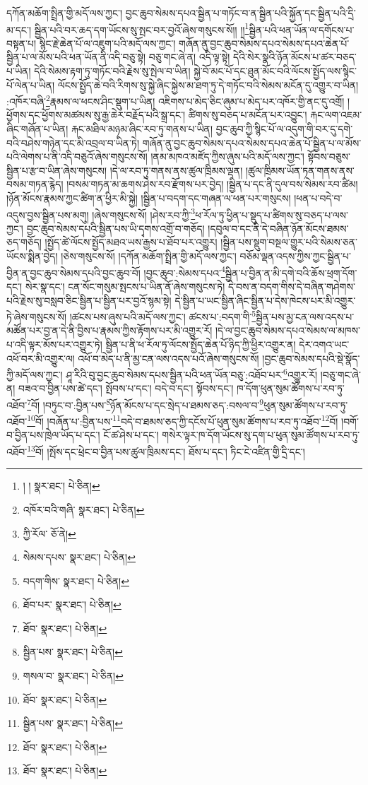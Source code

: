 དཀོན་མཆོག་སྤྲིན་གྱི་མདོ་ལས་ཀྱང་། བྱང་ཆུབ་སེམས་དཔའ་སྦྱིན་པ་གཏོང་བ་ན་སྦྱིན་པའི་སྐྱོན་དང་སྦྱིན་པའི་དྲི་མ་དང་། སྦྱིན་པའི་བར་ཆད་དག་ཡོངས་སུ་སྤང་བར་བྱའོ་ཞེས་གསུངས་སོ།། །།\footnote{། །  སྣར་ཐང་།  པེ་ཅིན། }སྦྱིན་པའི་ཕན་ཡོན་ལ་དགོངས་པ་བསྟན་པ། སྙིང་རྗེ་ཆེན་པོ་ལ་འཇུག་པའི་མདོ་ལས་ཀྱང་། གཞོན་ནུ་བྱང་ཆུབ་སེམས་དཔའ་སེམས་དཔའ་ཆེན་པོ་སྦྱིན་པ་ལ་མོས་པའི་ཕན་ཡོན་ནི་འདི་བཅུ་སྟེ། བཅུ་གང་ཞེ་ན། འདི་ལྟ་སྟེ། དེའི་སེར་སྣའི་ཉོན་མོངས་པ་ཚར་བཅད་པ་ཡིན། དེའི་སེམས་རྟག་ཏུ་གཏོང་བའི་རྗེས་སུ་སྤེལ་བ་ཡིན། སྐྱེ་བོ་མང་པོ་དང་ཐུན་མོང་བའི་ལོངས་སྤྱོད་ལས་སྙིང་པོ་ལེན་པ་ཡིན། ལོངས་སྤྱོད་ཆེ་བའི་རིགས་སུ་སྐྱེ་ཞིང་སྐྱེས་མ་ཐག་ཏུ་དེ་གཏོང་བའི་སེམས་མངོན་དུ་འགྱུར་བ་ཡིན། :འཁོར་བཞི་\footnote{འཁོར་བའི་གཞི་  སྣར་ཐང་།  པེ་ཅིན། }རྣམས་ལ་ཕངས་ཤིང་སྡུག་པ་ཡིན། འཇིགས་པ་མེད་ཅིང་ཞུམ་པ་མེད་པར་འཁོར་གྱི་ནང་དུ་འགྲོ། །ཕྱོགས་དང་ཕྱོགས་མཚམས་སུ་རྒྱ་ཆེར་བརྗོད་པའི་སྒྲ་དང་། ཚིགས་སུ་བཅད་པ་མངོན་པར་འབྱུང་། རྐང་ལག་འཇམ་ཞིང་གཞོན་པ་ཡིན། རྐང་མཐིལ་མཉམ་ཞིང་རབ་ཏུ་གནས་པ་ཡིན། བྱང་ཆུབ་ཀྱི་སྙིང་པོ་ལ་འདུག་གི་བར་དུ་དགེ་བའི་བཤེས་གཉེན་དང་མི་འབྲལ་བ་ཡིན་ཏེ། གཞོན་ནུ་བྱང་ཆུབ་སེམས་དཔའ་སེམས་དཔའ་ཆེན་པོ་སྦྱིན་པ་ལ་མོས་པའི་ལེགས་པ་ནི་འདི་བཅུའོ་ཞེས་གསུངས་སོ། །ནམ་མཁའ་མཛོད་ཀྱིས་ཞུས་པའི་མདོ་ལས་ཀྱང་། སྟོབས་བཅུས་སྦྱིན་པ་རྩ་བ་ཡིན་ཞེས་གསུངས། །དེ་ལ་རབ་ཏུ་གནས་ནས་ཚུལ་ཁྲིམས་ལྡན། །ཚུལ་ཁྲིམས་ཡོན་ཏན་གནས་ནས་བསམ་གཏན་རྙེད། །བསམ་གཏན་མ་ཆགས་ཤེས་རབ་རྫོགས་པར་བྱེད། །སྦྱིན་པ་དང་ནི་དུལ་བས་སེམས་རབ་ཚིམ། །ཉོན་མོངས་རྣམས་ཀྱང་ཚིག་ན་ཕྱིར་མི་སྐྱེ། །སྦྱིན་པ་བདག་དང་གཞན་ལ་ཕན་པར་གསུངས། །ཕན་པ་བདེ་བ་འདུས་བྱས་སྦྱིན་པས་མགུ། །ཞེས་གསུངས་སོ། །ཤེས་རབ་ཀྱི་\footnote{ཀྱི་རོལ་  ཅོ་ནེ། }ཕ་རོལ་ཏུ་ཕྱིན་པ་སྡུད་པ་ཚིགས་སུ་བཅད་པ་ལས་ཀྱང་། བྱང་ཆུབ་སེམས་དཔའི་སྦྱིན་པས་ཡི་དྭགས་འགྲོ་བ་གཅོད། །དབུལ་བ་དང་ནི་དེ་བཞིན་ཉོན་མོངས་ཐམས་ཅད་གཅོད། །སྤྱོད་ཚེ་ལོངས་སྤྱོད་མཐའ་ཡས་རྒྱས་པ་ཐོབ་པར་འགྱུར། །སྦྱིན་པས་སྡུག་བསྔལ་གྱུར་པའི་སེམས་ཅན་ཡོངས་སྨིན་བྱེད། །ཅེས་གསུངས་སོ། །དཀོན་མཆོག་སྤྲིན་གྱི་མདོ་ལས་ཀྱང་། བཅོམ་ལྡན་འདས་ཀྱིས་ཀྱང་སྦྱིན་པ་བྱིན་ན་བྱང་ཆུབ་སེམས་དཔའི་བྱང་ཆུབ་བོ། །བྱང་ཆུབ་:སེམས་དཔའ་\footnote{སེམས་དཔས་  སྣར་ཐང་།  པེ་ཅིན། }སྦྱིན་པ་བྱིན་ན་མི་དགེ་བའི་ཆོས་ཕྲག་དོག་དང་། སེར་སྣ་དང་། ངན་སོང་གསུམ་སྤངས་པ་ཡིན་ནོ་ཞེས་གསུངས་ཏེ། དེ་བས་ན་བདག་གིས་དེ་བཞིན་གཤེགས་པའི་རྗེས་སུ་བསླབ་ཅིང་སྦྱིན་པ་སྦྱིན་པར་བྱའོ་སྙམ་སྟེ། དེ་སྦྱིན་པ་ཡང་སྦྱིན་ཞིང་སྦྱིན་པ་དེས་ཁེངས་པར་མི་འགྱུར་ཏེ་ཞེས་གསུངས་སོ། །ཚངས་པས་ཞུས་པའི་མདོ་ལས་ཀྱང་། ཚངས་པ་:བདག་གི་\footnote{བདག་གིས་  སྣར་ཐང་།  པེ་ཅིན། }སྦྱིན་པས་མྱ་ངན་ལས་འདས་པ་མཚོན་པར་བྱ་ན་དེ་ནི་བྱིས་པ་རྣམས་ཀྱིས་རྟོགས་པར་མི་འགྱུར་རོ། །དེ་ལ་བྱང་ཆུབ་སེམས་དཔའ་སེམས་ལ་མཁས་པ་འདི་ལྟར་མོས་པར་འགྱུར་ཏེ། སྦྱིན་པ་ནི་ཕ་རོལ་ཏུ་ལོངས་སྤྱོད་ཆེན་པོ་ཉིད་ཀྱི་ཕྱིར་འགྱུར་ན། དེར་འགའ་ཡང་འཕོ་བར་མི་འགྱུར་ལ། འཕོ་བ་མེད་པ་ནི་མྱ་ངན་ལས་འདས་པའོ་ཞེས་གསུངས་སོ། །བྱང་ཆུབ་སེམས་དཔའི་སྡེ་སྣོད་ཀྱི་མདོ་ལས་ཀྱང་། ཤཱ་རིའི་བུ་བྱང་ཆུབ་སེམས་དཔས་སྦྱིན་པའི་ཕན་ཡོན་བཅུ་:འཐོབ་པར་\footnote{ཐོབ་པར་  སྣར་ཐང་།  པེ་ཅིན། }འགྱུར་རོ། །བཅུ་གང་ཞེ་ན། བཟའ་བ་བྱིན་པས་ཚེ་དང་། སྤོབས་པ་དང་། བདེ་བ་དང་། སྟོབས་དང་། ཁ་དོག་ཕུན་སུམ་ཚོགས་པ་རབ་ཏུ་འཐོབ་\footnote{ཐོབ་  སྣར་ཐང་།  པེ་ཅིན། }བོ། །བཏུང་བ་:བྱིན་པས་\footnote{སྦྱིན་པས་  སྣར་ཐང་།  པེ་ཅིན། }ཉོན་མོངས་པ་དང་སྲེད་པ་ཐམས་ཅད་:བསལ་བ་\footnote{གསལ་བ་  སྣར་ཐང་།  པེ་ཅིན། }ཕུན་སུམ་ཚོགས་པ་རབ་ཏུ་འཐོབ་\footnote{ཐོབ་  སྣར་ཐང་།  པེ་ཅིན། }བོ། །བཞོན་པ་:བྱིན་པས་\footnote{སྦྱིན་པས་  སྣར་ཐང་།  པེ་ཅིན། }བདེ་བ་ཐམས་ཅད་ཀྱི་དངོས་པོ་ཕུན་སུམ་ཚོགས་པ་རབ་ཏུ་འཐོབ་\footnote{ཐོབ་  སྣར་ཐང་།  པེ་ཅིན། }བོ། །བགོ་བ་བྱིན་པས་ཁྲེལ་ཡོད་པ་དང་། ངོ་ཚ་ཤེས་པ་དང་། གསེར་ལྟར་ཁ་དོག་ཡོངས་སུ་དག་པ་ཕུན་སུམ་ཚོགས་པ་རབ་ཏུ་འཐོབ་\footnote{ཐོབ་  སྣར་ཐང་།  པེ་ཅིན། }བོ། །སྤོས་དང་ཕྲེང་བ་བྱིན་པས་ཚུལ་ཁྲིམས་དང་། ཐོས་པ་དང་། ཏིང་ངེ་འཛིན་གྱི་དྲི་དང་། 